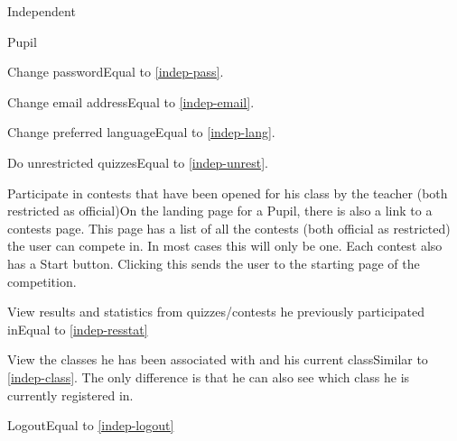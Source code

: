 \begin{section}{Independent}
    \end{section}
    

\begin{section}{Pupil}

    \begin{subsection}{Change password}Equal to \ref{indep-pass}.\end{subsection}
    \begin{subsection}{Change email address}Equal to \ref{indep-email}.\end{subsection}
    \begin{subsection}{Change preferred language}Equal to \ref{indep-lang}.\end{subsection}
    \begin{subsection}{Do unrestricted quizzes}Equal to \ref{indep-unrest}.\end{subsection}
    \begin{subsection}{Participate in contests that have been opened for his class by the teacher (both restricted as official)}On the landing page for a Pupil, there is also a link to a contests page. This page has a list of all the contests (both official as restricted) the user can compete in. In most cases this will only be one. Each contest also has a Start button. Clicking this sends the user to the starting page of the competition.\end{subsection}
    \begin{subsection}{View results and statistics from quizzes/contests he previously participated in}Equal to \ref{indep-resstat}\end{subsection}
    \begin{subsection}{View the classes he has been associated with and his current class}Similar to \ref{indep-class}. The only difference is that he can also see which class he is currently registered in.\end{subsection}
	\begin{subsection}{Logout}Equal to \ref{indep-logout}\end{subsection}

\end{section}